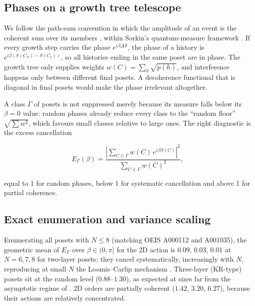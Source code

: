 \hypertarget{phases-on-a-growth-tree-telescope}{%
\subsection{Phases on a growth tree
telescope}\label{phases-on-a-growth-tree-telescope}}

We follow the path-sum convention in which the amplitude of
an event is the coherent sum over its members
\cite{Surya12, LC18, CCS23}, within Sorkin's
quantum-measure framework \cite{Sorkin94}. If every growth
step carries the phase \(e^{i\beta\Delta S}\), the phase of
a history is \(e^{i\beta(S(C_N)-S(C_1))}\), so all histories
ending in the same poset are in phase. The growth tree only
supplies weights \(w(C)=\sum_h\sqrt{p(h)}\), and
interference happens only between different final posets. A
decoherence functional that is diagonal in final posets
would make the phase irrelevant altogether.

A class \(\Gamma\) of posets is not suppressed merely
because its measure falls below its \(\beta=0\) value:
random phases already reduce every class to the ``random
floor'' \(\sqrt{\sum w^2}\), which favours small classes
relative to large ones. The right diagnostic is the excess
cancellation

\[E_\Gamma(\beta)=\frac{\left|\sum_{C\in\Gamma}w(C)\,e^{i\beta S(C)}\right|^2}{\sum_{C\in\Gamma}w(C)^2},\]

equal to 1 for random phases, below 1 for systematic
cancellation and above 1 for partial coherence.

\hypertarget{exact-enumeration-and-variance-scaling}{%
\subsection{Exact enumeration and variance
scaling}\label{exact-enumeration-and-variance-scaling}}

Enumerating all posets with \(N\le8\) (matching OEIS A000112
and A001035), the geometric mean of \(E_\Gamma\) over
\(\beta\in(0,\pi]\) for the 2D action is \(0.09\), \(0.03\),
\(0.01\) at \(N=6,7,8\) for two-layer posets: they cancel
systematically, increasingly with \(N\), reproducing at
small \(N\) the Loomis--Carlip mechanism \cite{LC18}.
Three-layer (KR-type) posets sit at the random level
(\(0.88\)--\(1.30\)), as expected at sizes far from the
asymptotic regime of \cite{CCS23}. 2D orders are partially
coherent (\(1.42\), \(3.20\), \(6.27\)), because their
actions are relatively concentrated.

